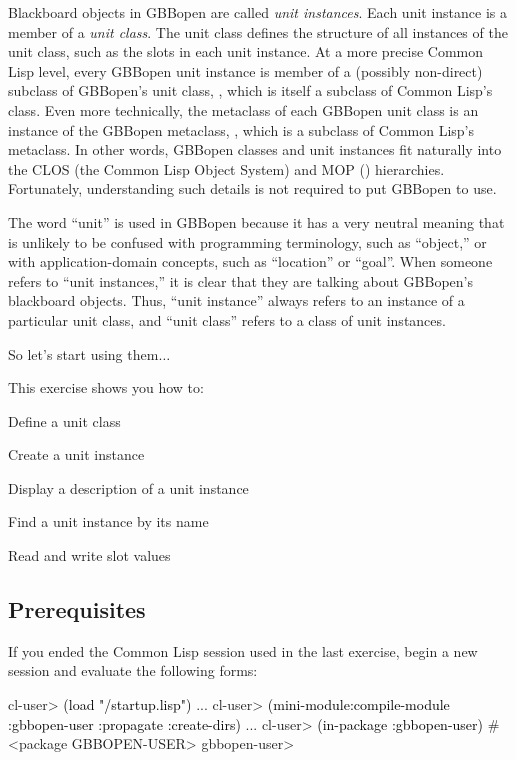 \documentclass[10pt,twoside,english,pdftex]{article}
\begin{document}
Blackboard objects in GBBopen are called \textit{unit instances}. Each unit
instance is a member of a \textit{unit class}.  The unit class defines the
structure of all instances of the unit class, such as the slots in each unit
instance.  At a more precise Common Lisp level, every GBBopen unit instance is
member of a (possibly non-direct) subclass of GBBopen's unit class,
, which is itself a subclass of Common Lisp's
 class.  Even more technically, the metaclass of each
GBBopen unit class is an instance of the GBBopen metaclass,
, which is a subclass of Common Lisp's
 metaclass.  In other words, GBBopen classes and unit
instances fit naturally into the CLOS (the Common Lisp Object System) and MOP
()
hierarchies. Fortunately, understanding such details is not required to put
GBBopen to use.

The word ``unit'' is used in GBBopen because it has a very neutral meaning
that is unlikely to be confused with programming terminology, such as
``object,'' or with application-domain concepts, such as ``location'' or
``goal''.  When someone refers to ``unit instances,'' it is clear that they
are talking about GBBopen's blackboard objects.  Thus, ``unit instance''
always refers to an instance of a particular unit class, and ``unit class''
refers to a class of unit instances.

So let's start using them$\ldots$

\fndocrule

This exercise shows you how to:
\begin{tightitemize}
\item Define a unit class
\item Create a unit instance
\item Display a description of a unit instance
\item Find a unit instance by its name
\item Read and write slot values
\end{tightitemize}

\fndocrule

\subsection*{Prerequisites}

%
%
If you ended the Common Lisp session used in the last exercise, begin a new
session and evaluate the following forms:
%
\W\supp
\begin{example}
\textcolor{darkergray}{%
  cl-user> \textcolor{black}{(load "/startup.lisp")}
     ...
  cl-user> \textcolor{black}{(mini-module:compile-module :gbbopen-user :propagate :create-dirs)}
     ...
  cl-user> \textcolor{black}{(in-package :gbbopen-user)}
  #<package GBBOPEN-USER>
  gbbopen-user>}
\end{example}
\end{document}
